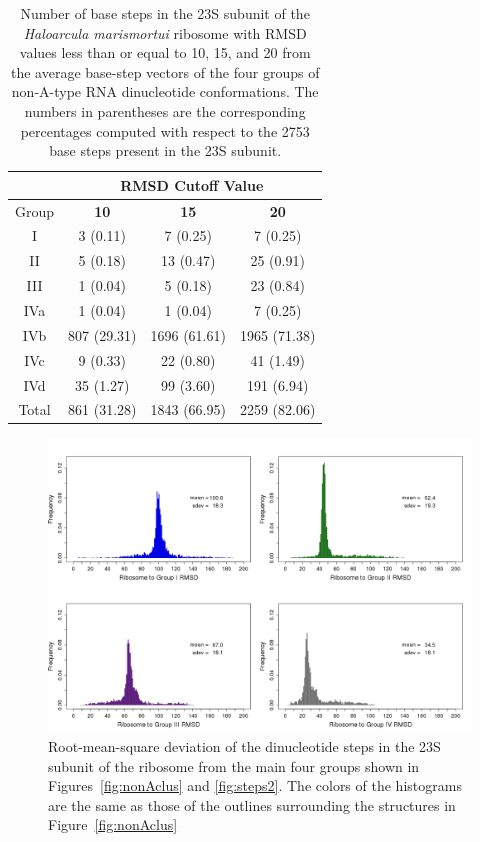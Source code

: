 \begin{table}[htbp]
\begin{center}
\begin{tabular}{c|c|c|c}
\hline
 & \multicolumn{3}{c}{\bf{RMSD Cutoff Value}}\\ \hline
Group   & \bf{10} & \bf{15} & \bf{20}\\ \hline
I & 3 (0.11) & 7 (0.25) & 7 (0.25)\\ \hline
II & 5 (0.18) & 13 (0.47) & 25 (0.91)\\ \hline
III & 1 (0.04) & 5 (0.18) & 23 (0.84)\\ \hline
IVa & 1 (0.04) & 1 (0.04) & 7 (0.25)\\ \hline
IVb & 807 (29.31) & 1696 (61.61) & 1965 (71.38)\\ \hline
IVc & 9 (0.33) & 22 (0.80) & 41 (1.49)\\ \hline
IVd & 35 (1.27) & 99 (3.60) & 191 (6.94)\\ \hline \hline
Total & 861 (31.28) & 1843 (66.95) & 2259 (82.06)\\ \hline
\end{tabular}
\caption{Number of base steps in the 23S subunit of the \textit{Haloarcula
marismortui} ribosome with  RMSD values less than or  equal to 10, 15,
and  20 from  the  average base-step  vectors  of the  four groups  of
non-A-type RNA dinucleotide  conformations. The numbers in parentheses
are the  corresponding percentages computed  with respect to  the 2753
base steps present in the 23S subunit.}
\label{tab:nonA}
\end{center}
\end{table}

\begin{figure}[htbp]
 \centering
\includegraphics[angle=90, scale=0.5]{Chapter2/RMSDschneider1.png}
\caption{Root-mean-square deviation  of the dinucleotide  steps in the
  23S  subunit of  the ribosome  from the  main four  groups  shown in
  Figures~\ref{fig:nonAclus} and \ref{fig:steps2}.   The colors of the
  histograms are  the same  as those of  the outlines  surrounding the
  structures in Figure~\ref{fig:nonAclus}}
 \label{fig:histo1}
\end{figure}

